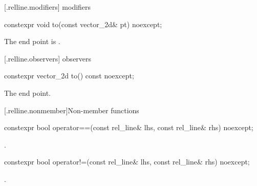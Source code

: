  [\iotwod.relline.modifiers]{ modifiers}

\begin{itemdecl}
constexpr void to(const vector_2d& pt) noexcept;
\end{itemdecl}
\begin{itemdescr}
\pnum
\effects
The end point is .
\end{itemdescr}

 [\iotwod.relline.observers]{ observers}

%
\begin{itemdecl}
constexpr vector_2d to() const noexcept;
\end{itemdecl}
\begin{itemdescr}
\pnum
\returns
The end point.
\end{itemdescr}

 [\iotwod.relline.nonmember]{Non-member functions}

%
\begin{itemdecl}
constexpr bool operator==(const rel_line& lhs, const rel_line& rhs) noexcept;
\end{itemdecl}
\begin{itemdescr}
\pnum
\returns
{}.
\end{itemdescr}

%
\begin{itemdecl}
constexpr bool operator!=(const rel_line& lhs, const rel_line& rhs) noexcept;
\end{itemdecl}
\begin{itemdescr}
\pnum
\returns
{}.
\end{itemdescr}
